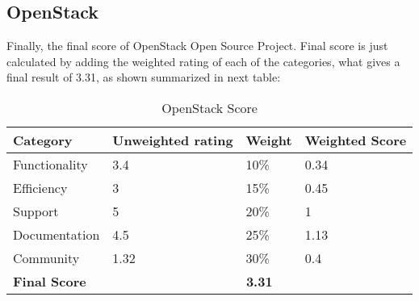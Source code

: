 \documentclass[11pt]{article}
\begin{document}
\subsection{OpenStack}
Finally, the final score of OpenStack Open Source Project. Final score is just calculated by adding the weighted rating of each of the categories, what gives a final result of 3.31, as shown summarized in next table:
\begin{table}[H]
  \begin{center}
    \begin{tabular}{ | p{3cm} | p{2.5cm} | p{1.5cm} | p{2cm} | }
    \toprule
    \textbf{Category} & \textbf{Unweighted rating} & \textbf{Weight} & \textbf{Weighted Score}\\
    \hline
    Functionality & 3.4 & 10\% & 0.34\\
    \hline
    Efficiency & 3 & 15\% & 0.45\\
    \hline
    Support & 5 & 20\% & 1\\
    \hline
    Documentation & 4.5 & 25\% & 1.13\\
    \hline
    Community & 1.32 & 30\% & 0.4\\
    \midrule
    \textbf{Final Score} & \multicolumn {3}{c|}{\textbf{3.31}}\\
    \bottomrule
    \end{tabular}
    \caption{OpenStack Score}
    \label{tab:openstack_score}
  \end{center}
\end{table}
\end{document}
